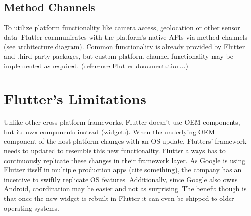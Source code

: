 \subsection{Method Channels}
To utilize platform functionality like camera access, geolocation or other sensor data, Flutter communicates with the platform's native APIs via 
method channels (see architecture diagram). Common functionality is already provided by Flutter and third party packages, but custom platform channel
functionality may be implemented as required. (reference Flutter doucmentation...)

\section{Flutter's Limitations}
Unlike other cross-platform frameworks, Flutter doesn't use OEM components, but its own components instead (widgets).
When the underlying OEM component of the host platform changes with an OS update, Flutters' framework needs to updated to resemble this new 
functionality. Flutter always has to continuously replicate these changes in their framework layer. As Google is using Flutter itself in multiple 
production apps (cite something), the company has an incentive to swiftly replicate OS features. Additionally, since Google also owns Android, 
coordination may be easier and not as surprising.
The benefit though is that once the new widget is rebuilt in Flutter it can even be shipped to older operating systems.